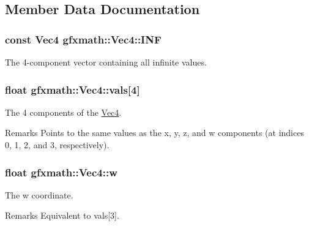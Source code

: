 \subsection{Member Data Documentation}
\hypertarget{structgfxmath_1_1_vec4_a38e1933d9d6d5dd565a424a0a049f92e}{}
\subsubsection[{I\+N\+F}]{\setlength{\rightskip}{0pt plus 5cm}const {\bf Vec4} gfxmath\+::\+Vec4\+::\+I\+N\+F\hspace{0.3cm}{\ttfamily [static]}}\label{structgfxmath_1_1_vec4_a38e1933d9d6d5dd565a424a0a049f92e}


The 4-\/component vector containing all infinite values. 

\hypertarget{structgfxmath_1_1_vec4_aa668d284af0138ed1d09663fb0bd3d6f}{}
\subsubsection[{vals}]{\setlength{\rightskip}{0pt plus 5cm}float gfxmath\+::\+Vec4\+::vals\mbox{[}4\mbox{]}}\label{structgfxmath_1_1_vec4_aa668d284af0138ed1d09663fb0bd3d6f}


The 4 components of the \hyperlink{structgfxmath_1_1_vec4}{Vec4}. 

\begin{DoxyRemark}{Remarks}
Points to the same values as the x, y, z, and w components (at indices 0, 1, 2, and 3, respectively). 
\end{DoxyRemark}
\hypertarget{structgfxmath_1_1_vec4_adf2769a47b464dfee8d04e191f21701e}{}
\subsubsection[{w}]{\setlength{\rightskip}{0pt plus 5cm}float gfxmath\+::\+Vec4\+::w}\label{structgfxmath_1_1_vec4_adf2769a47b464dfee8d04e191f21701e}


The w coordinate. 

\begin{DoxyRemark}{Remarks}
Equivalent to vals\mbox{[}3\mbox{]}. 
\end{DoxyRemark}
\hypertarget{structgfxmath_1_1_vec4_a273598aff75406f0e7a47121b8b06037}{}
